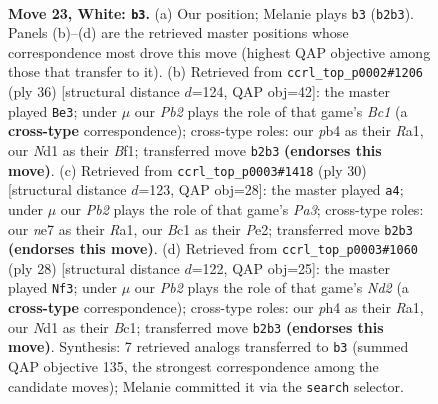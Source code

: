 \documentclass[11pt]{article}
\begin{document}
\clearpage

\begin{figure}[p]\centering
\begin{subfigure}{0.46\textwidth}\centering
\resizebox{\linewidth}{!}{%
\newchessgame
\chessboard[
  setfen={1n1qkbr1/1Q2n3/r1p3p1/p2p2P1/1p1P2Bp/7P/PPP1KP2/R1BNR3 w - - 2 23},
  showmover=false,
  pgfstyle=straightmove, color=movearrow, markmove={b2-b3}
]}
\caption{}
\end{subfigure}\hfill
\begin{subfigure}{0.46\textwidth}\centering
\resizebox{\linewidth}{!}{%
\newchessgame
\chessboard[
  setfen={r2q2k1/pp3ppb/4nn1p/P1ppQ3/8/1PPN1P2/2P3PP/R1B2BK1 w - - 0 19},
  showmover=false,
  pgfstyle=straightmove, color=movearrow, markmove={c1-e3}
]}
\caption{}
\end{subfigure}
\\[4pt]
\begin{subfigure}{0.46\textwidth}\centering
\resizebox{\linewidth}{!}{%
\newchessgame
\chessboard[
  setfen={2r1nrk1/ppq2ppp/2n1b3/1Q2p1B1/4N3/P1P3P1/4PPBP/R4RK1 w - - 8 16},
  showmover=false,
  pgfstyle=straightmove, color=movearrow, markmove={a3-a4}
]}
\caption{}
\end{subfigure}\hfill
\begin{subfigure}{0.46\textwidth}\centering
\resizebox{\linewidth}{!}{%
\newchessgame
\chessboard[
  setfen={r1b2r1k/ppq2ppp/2p3n1/P3p2Q/1bB1P3/6P1/1PPN1P1P/R1B2RK1 w - - 1 15},
  showmover=false,
  pgfstyle=straightmove, color=movearrow, markmove={d2-f3}
]}
\caption{}
\end{subfigure}
\caption{\textbf{Move 23, White: \texttt{b3}.} (a) Our position; Melanie plays \texttt{b3} (\texttt{b2b3}). Panels (b)--(d) are the retrieved master positions whose correspondence most drove this move (highest QAP objective among those that transfer to it). (b) Retrieved from \texttt{ccrl\_top\_p0002\#1206} (ply 36) [structural distance $d$=124, QAP obj=42]: the master played \texttt{Be3}; under $\mu$ our \emph{Pb2} plays the role of that game's \emph{Bc1} (a \textbf{cross-type} correspondence); cross-type roles: our \emph{p}b4 as their \emph{R}a1, our \emph{N}d1 as their \emph{B}f1; transferred move \texttt{b2b3} \textbf{(endorses this move)}. (c) Retrieved from \texttt{ccrl\_top\_p0003\#1418} (ply 30) [structural distance $d$=123, QAP obj=28]: the master played \texttt{a4}; under $\mu$ our \emph{Pb2} plays the role of that game's \emph{Pa3}; cross-type roles: our \emph{n}e7 as their \emph{R}a1, our \emph{B}c1 as their \emph{P}e2; transferred move \texttt{b2b3} \textbf{(endorses this move)}. (d) Retrieved from \texttt{ccrl\_top\_p0003\#1060} (ply 28) [structural distance $d$=122, QAP obj=25]: the master played \texttt{Nf3}; under $\mu$ our \emph{Pb2} plays the role of that game's \emph{Nd2} (a \textbf{cross-type} correspondence); cross-type roles: our \emph{p}h4 as their \emph{R}a1, our \emph{N}d1 as their \emph{B}c1; transferred move \texttt{b2b3} \textbf{(endorses this move)}. Synthesis: 7 retrieved analogs transferred to \texttt{b3} (summed QAP objective 135, the strongest correspondence among the candidate moves); Melanie committed it via the \texttt{search} selector.}
\label{fig:thought-m44}
\end{figure}
\end{document}
